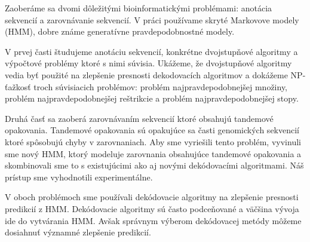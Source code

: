 Zaoberáme sa dvomi dôležitými bioinformatickými problémami: anotácia sekvencií
a zarovnávanie sekvencií. V práci používame skryté Markovove modely (HMM),
dobre známe generatívne pravdepodobnostné modely.

V prvej časti študujeme anotáciu sekvencií, konkrétne dvojstupňové algoritmy a
výpočtové problémy ktoré s nimi súvisia. Ukážeme, že dvojstupňové algoritmy
vedia byť použité na zlepšenie presnosti dekodovacích algoritmov a dokážeme
NP-ťažkosť troch súvisiacich problémov: problém najpravdepodobnejšej množiny,
problém najpravdepodobnejšej reštrikcie a problém najpravdepodobnejšej stopy.

Druhá časť sa zaoberá zarovnávaním sekvencií ktoré obsahujú tandemové
opakovania. Tandemové opakovania sú  opakujúce sa časti genomických sekvencií
ktoré spôsobujú chyby v zarovnaniach. Aby sme vyriešili tento problém, vyvinuli
sme nový HMM, ktorý modeluje zarovnania obsahujúce tandemové opakovania a
skombinovali sme to s existujúcimi ako aj novými dekódovacími algoritmami. Náš
prístup sme vyhodnotili experimentálne.

V oboch problémoch sme používali dekódovacie algoritmy na zlepšenie presnosti
predikcií z HMM. Dekódovacie algoritmy sú často podceňované  a väčšina vývoja
ide do vytvárania HMM. Avšak správnym výberom dekódovacej metódy môžeme
dosiahnuť významné zlepšenie predikcií.
